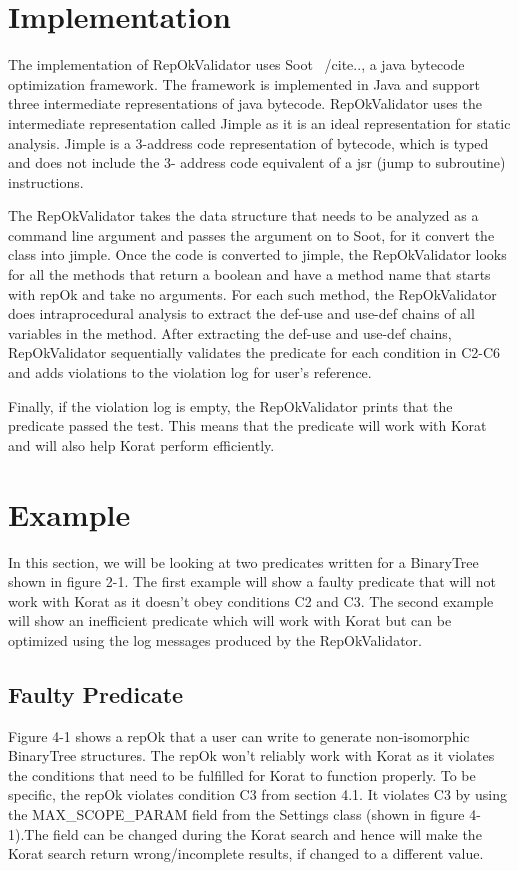 \section{Implementation}
The implementation of RepOkValidator uses Soot ~/cite{..}, a java bytecode optimization framework. The framework is implemented in Java and support three intermediate representations of java bytecode. RepOkValidator uses the intermediate representation called Jimple as it is an ideal representation for static analysis. Jimple is a 3-address code representation of bytecode, which is typed and does not include the 3- address code equivalent of a jsr (jump to subroutine) instructions.

\par
The RepOkValidator takes the data structure that needs to be analyzed as a command line argument and passes the argument on to Soot, for it convert the class into jimple. Once the code is converted to jimple, the RepOkValidator looks for all the methods that return a boolean and have a method name that starts with repOk and take no arguments. For each such method, the RepOkValidator does intraprocedural analysis to extract the def-use and use-def chains of all variables in the method. After extracting the def-use and use-def chains, RepOkValidator sequentially validates the predicate for each condition in C2-C6 and adds violations to the violation log for user’s reference.

\par
Finally, if the violation log is empty, the RepOkValidator prints that the predicate passed the test. This means that the predicate will work with Korat and will also help Korat perform efficiently.

\section{Example}
In this section, we will be looking at two predicates written for a BinaryTree shown in figure 2-1. The first example will show a faulty predicate that will not work with Korat as it doesn’t obey conditions C2 and C3. The second example will show an inefficient predicate which will work with Korat but can be optimized using the log messages produced by the RepOkValidator.

\subsection{Faulty Predicate}
Figure 4-1 shows a repOk that a user can write to generate non-isomorphic BinaryTree structures. The repOk won't reliably work with Korat as it violates the conditions that need to be fulfilled for Korat to function properly. To be specific, the repOk violates condition C3 from section 4.1. It violates C3 by using the MAX\_SCOPE\_PARAM field from the Settings class (shown in figure 4-1).The field can be changed during the Korat search and hence will make the Korat search return wrong/incomplete results, if changed to a different value.

